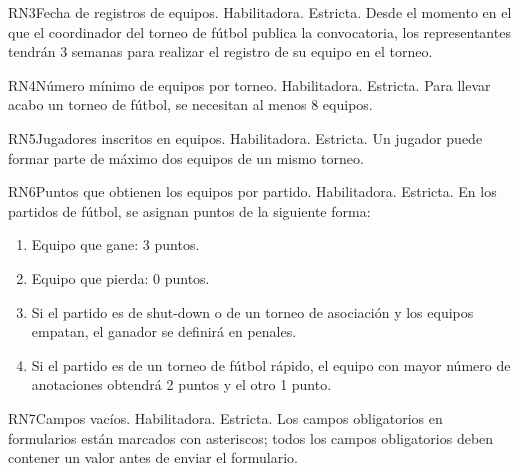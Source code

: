 \begin{BussinesRule}{RN3}{Fecha de registros de equipos.} 
	\BRitem[Tipo:] Habilitadora.
	\BRitem[Nivel:] Estricta.
	\BRitem[Descripción:] Desde el momento en el que el coordinador del torneo de fútbol publica la convocatoria, los representantes tendrán 3 semanas para realizar el registro de su equipo en el torneo.
\end{BussinesRule}

\begin{BussinesRule}{RN4}{Número mínimo de equipos por torneo.} 
	\BRitem[Tipo:] Habilitadora.
	\BRitem[Nivel:] Estricta.
	\BRitem[Descripción:] Para llevar acabo un torneo de fútbol, se necesitan al menos 8 equipos.
\end{BussinesRule}

\begin{BussinesRule}{RN5}{Jugadores inscritos en equipos.} 
	\BRitem[Tipo:] Habilitadora.
	\BRitem[Nivel:] Estricta.
	\BRitem[Descripción:] Un jugador puede formar parte de máximo dos equipos de un mismo torneo.
\end{BussinesRule}

\begin{BussinesRule}{RN6}{Puntos que obtienen los equipos por partido.} 
	\BRitem[Tipo:] Habilitadora.
	\BRitem[Nivel:] Estricta.
	\BRitem[Descripción:] En los partidos de fútbol, se asignan puntos de la siguiente forma:
	\begin{enumerate}
	\item Equipo que gane: 3 puntos.
	\item Equipo que pierda: 0 puntos.
	\item Si el partido es de shut-down o de un torneo de asociación y los equipos empatan, el ganador se definirá en penales.
	\item Si el partido es de un torneo de fútbol rápido, el equipo con mayor número de anotaciones obtendrá 2 puntos y el otro 1 punto.
	\end{enumerate}
\end{BussinesRule}

\begin{BussinesRule}{RN7}{Campos vacíos.} 
	\BRitem[Tipo:] Habilitadora.
	\BRitem[Nivel:] Estricta.
	\BRitem[Descripción:] Los campos obligatorios en formularios están marcados con asteriscos; todos los campos obligatorios deben contener un valor antes de enviar el formulario.
\end{BussinesRule}

